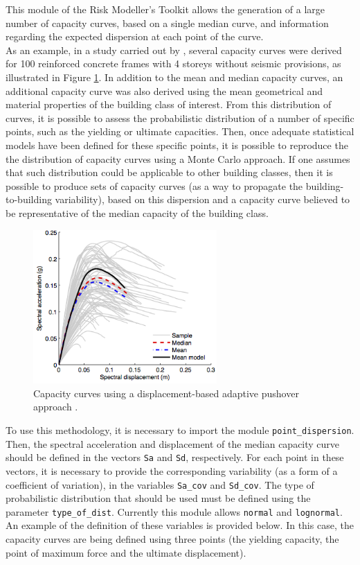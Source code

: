 This module of the Risk Modeller's Toolkit allows the generation of a large number of capacity curves, based on a single median curve, and information regarding the expected dispersion at each point of the curve. \\

As an example, in a study carried out by \cite{SilvaEtAl2014b}, several capacity curves were derived for 100 reinforced concrete frames with 4 storeys without seismic provisions, as illustrated in Figure \ref{fig:set_cc}. In addition to the mean and median capacity curves, an additional capacity curve was also derived using the mean geometrical and material properties of the building class of interest. From this distribution of curves, it is possible to assess the probabilistic distribution of a number of specific points, such as the yielding or ultimate capacities. Then, once adequate statistical models have been defined for these specific points, it is possible to reproduce the the distribution of capacity curves using a Monte Carlo approach. If one assumes that such distribution could be applicable to other building classes, then it is possible to produce sets of capacity curves (as a way to propagate the building-to-building variability), based on this dispersion and a capacity curve believed to be representative of the median capacity of the building class.

\begin{figure}[htb]
  \centering
      \includegraphics[width=7cm]{Figures/set_capacity_curves.png}
  \caption{Capacity curves using a displacement-based adaptive pushover approach \citep{SilvaEtAl2014b}.}
  \label{fig:set_cc}
\end{figure}

To use this methodology, it is necessary to import the module \verb=point_dispersion=. Then, the spectral acceleration and displacement of the median capacity curve should be defined in the vectors \verb=Sa= and \verb=Sd=, respectively. For each point in these vectors, it is necessary to provide the corresponding variability (as a form of a coefficient of variation), in the variables \verb=Sa_cov= and \verb=Sd_cov=. The type of probabilistic distribution that should be used must be defined using the parameter \verb=type_of_dist=. Currently this module allows \verb=normal= and \verb=lognormal=. An example of the definition of these variables is provided below. In this case, the capacity curves are being defined using three points (the yielding capacity, the point of maximum force and the ultimate displacement).

